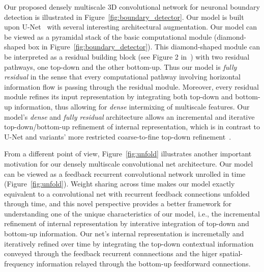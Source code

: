 \documentclass{article}
\begin{document}
Our proposed densely multiscale 3D convolutional network for neuronal boundary
detection is illustrated in Figure~\ref{fig:boundary_detector}. Our model is
built upon U-Net~\cite{unet} with several interesting architectural
augmentation. Our model can be viewed as a pyramidal stack of the basic
computational module (diamond-shaped box in Figure~\ref{fig:boundary_detector}).
This diamond-shaped module can be interpreted as a residual building block (see
Figure 2 in~\cite{resnet}) with two residual pathways, one top-down and the
other bottom-up. Thus our model is \emph{fully residual} in the sense that every
computational pathway involving horizontal information flow is passing through
the residual module. Moreover, every residual module refines its input
representation by integrating both top-down and bottom-up information, thus
allowing for \emph{dense} intermixing of multiscale features. Our model's
\emph{dense} and \emph{fully residual} architecture allows an incremental and
iterative top-down/bottom-up refinement of internal representation, which is in
contrast to U-Net and variants' more restricted coarse-to-fine top-down
refinement~\cite{pinheiro2016refine,lin2016pyramid}.

From a different point of view, Figure~\ref{fig:unfold} illustrates another
important motivation for our densely multiscale convolutional net architecture.
Our model can be viewed as a feedback recurrent convolutional network unrolled
in time (Figure~\ref{fig:unfold}). Weight sharing across time makes our model
exactly equivalent to a convolutional net with recurrent feedback connections
unfolded through time, and this novel perspective provides a better framework
for understanding one of the unique characteristics of our model, i.e., the
incremental refinement of internal representation by interative integration of
top-down and bottom-up information. Our net's internal representation is
incremetally and iteratively refined over time by integrating the top-down
contextual information conveyed through the feedback recurrent connnections and
the higer spatial-frequency information relayed through the bottom-up
feedforward connections.
\end{document}
